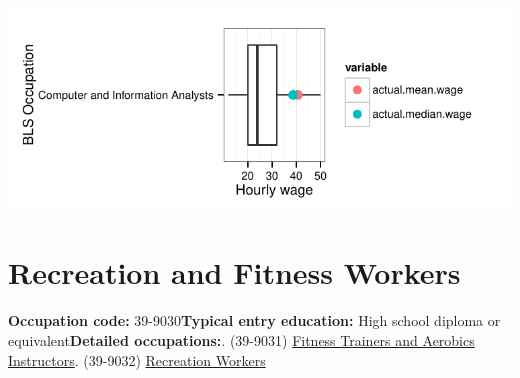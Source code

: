 \documentclass[a4paper,10pt]{article}\usepackage[]{graphicx}\usepackage[]{color}
\makeatletter
\def\maxwidth{ %
  \ifdim\Gin@nat@width>\linewidth
    \linewidth
  \else
    \Gin@nat@width
  \fi
}
\makeatother
\begin{document}
{\centering \includegraphics[width=\maxwidth]{figure/unnamed-chunk-257} 

}


\newpage\section{Recreation and Fitness Workers}\textbf{Occupation code:} 39-9030\newline\textbf{Typical entry education:} High school diploma or equivalent\newline\textbf{Detailed occupations:}. (39-9031)  \href{http://www.bls.gov/oes/current/oes399031.htm}{Fitness Trainers and Aerobics Instructors}. (39-9032)  \href{http://www.bls.gov/oes/current/oes399032.htm}{Recreation Workers}\newline%
\end{document}
